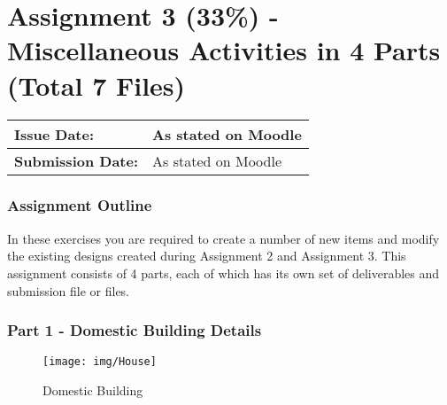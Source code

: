 
	

\part*{Assignment 3 (33\%) - Miscellaneous Activities in 4 Parts (Total 7 Files)}



\begin{tabularx}{\textwidth}{ |X|X| }
	\hline
	\textbf{Issue Date:} & As stated on Moodle \\
	\hline 
	\textbf{Submission Date:}  & As stated on Moodle  \\
	\hline
\end{tabularx}



\section*{Assignment Outline}



In these exercises you are required to create a number of new items and modify the existing designs created during Assignment 2 and Assignment 3.  This assignment consists of 4 parts, each of which has its own set of deliverables and submission file or files.

\newpage
\section*{Part 1 - Domestic Building Details}



\begin{figure}
	\centering
	\texttt{[image: img/House]}
	\caption{Domestic Building}
	\label{fig:house}
\end{figure}



